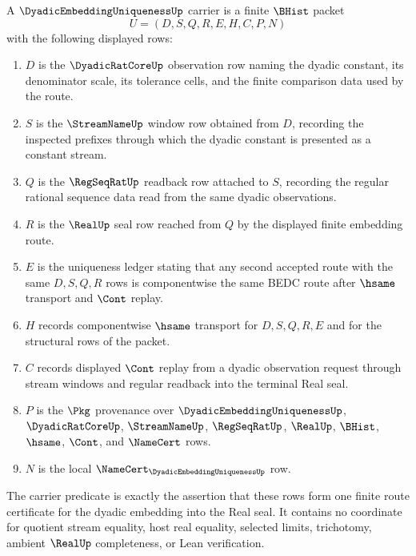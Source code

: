 \begin{definition}
\label{def:dyadic-embedding-uniqueness-carrier}
A $\DyadicEmbeddingUniquenessUp$ carrier is a finite $\BHist$ packet
$$
U=(D,S,Q,R,E,H,C,P,N)
$$
with the following displayed rows:
\begin{enumerate}
\item $D$ is the $\DyadicRatCoreUp$ observation row naming the dyadic constant, its denominator scale, its tolerance cells, and the finite comparison data used by the route.
\item $S$ is the $\StreamNameUp$ window row obtained from $D$, recording the inspected prefixes through which the dyadic constant is presented as a constant stream.
\item $Q$ is the $\RegSeqRatUp$ readback row attached to $S$, recording the regular rational sequence data read from the same dyadic observations.
\item $R$ is the $\RealUp$ seal row reached from $Q$ by the displayed finite embedding route.
\item $E$ is the uniqueness ledger stating that any second accepted route with the same $D,S,Q,R$ rows is componentwise the same BEDC route after $\hsame$ transport and $\Cont$ replay.
\item $H$ records componentwise $\hsame$ transport for $D,S,Q,R,E$ and for the structural rows of the packet.
\item $C$ records displayed $\Cont$ replay from a dyadic observation request through stream windows and regular readback into the terminal Real seal.
\item $P$ is the $\Pkg$ provenance over $\DyadicEmbeddingUniquenessUp$, $\DyadicRatCoreUp$, $\StreamNameUp$, $\RegSeqRatUp$, $\RealUp$, $\BHist$, $\hsame$, $\Cont$, and $\NameCert$ rows.
\item $N$ is the local $\NameCert_{\DyadicEmbeddingUniquenessUp}$ row.
\end{enumerate}
The carrier predicate is exactly the assertion that these rows form one finite route certificate for the dyadic embedding into the Real seal. It contains no coordinate for quotient stream equality, host real equality, selected limits, trichotomy, ambient $\RealUp$ completeness, or Lean verification.
\end{definition}

